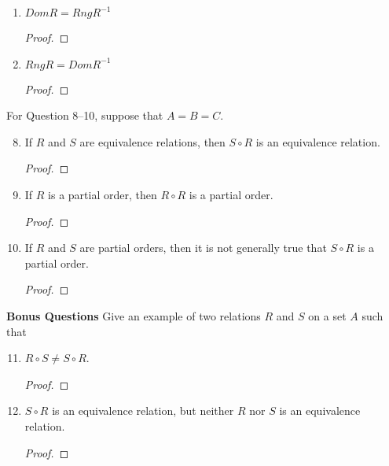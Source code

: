 \documentclass{article}
\begin{document}
\begin{enumerate}
\begin{proof}
      \end{proof}
    \item $Dom R = Rng R^{-1}$
      \begin{proof}
        
      \end{proof}
    \item $Rng R = Dom R^{-1}$
      \begin{proof}
        
      \end{proof}
  \end{enumerate}
  For Question 8–10, suppose that $A = B = C$.
  \begin{enumerate} \setcounter{enumi}{7}
    \item If $R$ and $S$ are equivalence relations, then $S \circ R$ is an equivalence relation.
      \begin{proof}
        
      \end{proof}
    \item If $R$ is a partial order, then $R \circ R$ is a partial order.
      \begin{proof}
        
      \end{proof}
    \item If $R$ and $S$ are partial orders, then it is not generally true that $S \circ R$ is a partial order.
      \begin{proof}
        
      \end{proof}
  \end{enumerate}
  \textbf{Bonus Questions}
  Give an example of two relations $R$ and $S$ on a set $A$ such that \\
  \begin{enumerate} \setcounter{enumi}{10}
    \item $R \circ S \neq S \circ R$.
      \begin{proof}
        
      \end{proof}
    \item $S \circ R$ is an equivalence relation, but neither $R$ nor $S$ is an equivalence relation.
      \begin{proof}
        
      \end{proof}
   \end{enumerate}
\end{document}
